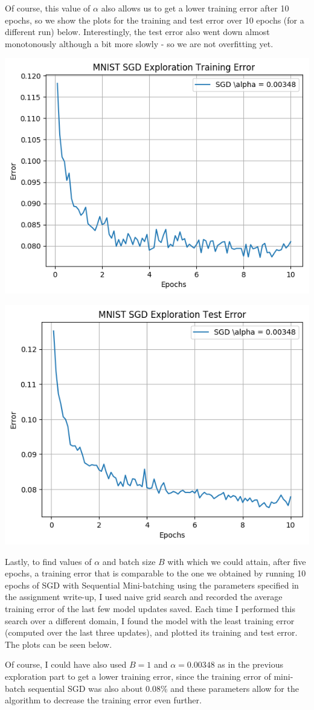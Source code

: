 \documentclass[10pt]{article}
\begin{document}
Of course, this value of $\alpha$ also allows us to get a lower training error after 10 epochs, so we show the plots for the training and test error over 10 epochs (for a different run) below. Interestingly, the test error also went down almost monotonously although a bit more slowly - so we are not overfitting yet.

\begin{center}
    \includegraphics[width=.45\textwidth]{SGDExplorationTraining10.png}
    \label{fig:expl2tr}
\end{center}
\begin{center}
    \includegraphics[width=.45\textwidth]{SGDExplorationTest10.png}
    \label{fig:expl2te}
\end{center}

Lastly, to find values of $\alpha$ and batch size $B$ with which we could attain, after five epochs, a training error that is comparable to the one we obtained by running 10 epochs of SGD with Sequential Mini-batching using the parameters specified in the assignment write-up, I used naive grid search and recorded the average training error of the last few model updates saved. Each time I performed this search over a different domain, I found the model with the least training error (computed over the last three updates), and plotted its training and test error. The plots can be seen below.

Of course, I could have also used $B=1$ and $\alpha = 0.00348$ as in the previous exploration part to get a lower training error, since the training error of mini-batch sequential SGD was also about 0.08\% and these parameters allow for the algorithm to decrease the training error even further.
\end{document}
